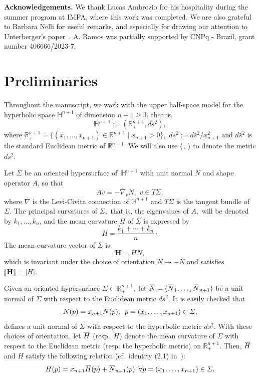 \documentclass{amsart}[12pt]
\newcommand{\norma}[1]{\Vert #1 \Vert}
\newcommand{\ol}{\overline}
\theoremstyle{definition}
\theoremstyle{plain}
\newcommand{\R}{\mathbb{R} }
\newcommand{\h}{\mathbb{H} }
\newcommand{\abs}[1]{\vert #1\vert}
\renewcommand{\Sigma}{\varSigma}
\newcommand{\overbar}[1]{\mkern 1.5mu\overline{\mkern-1.5mu#1\mkern-1.5mu}\mkern 1.5mu}
\newcommand{\forma}[1]{\langle #1\rangle}
\begin{document}
\bigskip

\noindent
{\bf Acknowledgements.} We thank Lucas Ambrozio for his hospitality during the summer program at IMPA,
where this work was completed. We are also grateful to Barbara Nelli for useful remarks,
and especially for drawing our attention to Unterberger's paper~\cite{unterberger}.
A. Ramos was partially supported by CNPq - Brazil, grant number 406666/2023-7.

\section{Preliminaries} \label{sec-preliminaries}
Throughout the manuscript, we work with the upper half-space model for
the hyperbolic space $\h^{n+1}$ of dimension $n+1\ge 3$, that is,
$$\h^{n+1}:=(\R_+^{n+1},ds^2),$$
where $\R^{n+1}_+ = \{(x_1,\dots, x_{n+1})\in \R^{n+1}\mid x_{n+1}>0\},$
$ds^2:={d\bar s^2}/{x_{n+1}^2}$ and
$d\bar s^2$ is the standard Euclidean
metric of $\R_+^{n+1}.$ We will also use $\forma{\,,\,}$ to
denote the metric $ds^2$.

Let $\Sigma$ be an oriented hypersurface
of \,$\h^{n+1}$ with
unit normal $N$ and shape operator
$A$, so that
\[
Av=-\ol \nabla_vN, \,\, v\in T\Sigma,
\]
where $\ol \nabla$ is the Levi-Civita connection of $\h^{n+1}$ and
$T\Sigma$ is the tangent bundle of $\Sigma$.
The principal curvatures of $\Sigma,$ that is,
the eigenvalues of $A,$ will be denoted by
$k_1, \dots ,k_n$, and
the mean curvature $H$ of $\Sigma$ is expressed by
\[
H=\frac{k_1+\cdots +k_n}n\cdot
\]
The mean curvature vector of $\Sigma$ is
\begin{equation*}\mathbf{H}=HN,\end{equation*}
which is invariant under the choice of orientation
$N\to -N$ and satisfies $\norma{\mathbf{H}} = \abs{H}$.


Given an oriented hypersurface $\Sigma\subset\R_+^{n+1},$ let
$\overbar N=(\overbar N_1,\dots, \overbar N_{n+1})$
be a unit normal of $\Sigma$ with respect to
the Euclidean metric $d\bar s^2.$
It is easily checked that
\begin{align*}
N(p)=x_{n+1}\overbar N(p), \,\,\, p=(x_1,\dots, x_{n+1})\in\Sigma,
\end{align*}
defines a unit normal of $\Sigma$ with respect to the
hyperbolic metric $ds^2.$
With these choices of orientation, let
$\overbar H$ (resp.~$H$) denote the mean curvature of $\Sigma$ with respect to the Euclidean metric
(resp. the hyperbolic metric) on $\R_+^{n+1}$.
Then, $\overbar H$ and $H$ satisfy the following relation
(cf.~identity (2.1) in~\cite{gs}):
\begin{equation} \label{eq-MCrelation}
H(p)=x_{n+1}\overbar H(p)+\overbar N_{n+1}(p) \,\,\, \forall p=(x_1,\dots, x_{n+1})\in\Sigma.
\end{equation}
\end{document}

